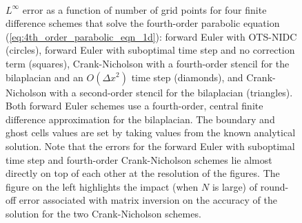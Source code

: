 \documentclass[fleqn,12pt,twoside]{article}
\def\dx{\Delta x}
\begin{document}
\begin{figure}[tb]
\begin{center}
\ \ 
\caption{$L^\infty$ error as a function of number of grid points for four
finite difference schemes that solve the fourth-order parabolic equation
(\ref{eq:4th_order_parabolic_eqn_1d}):
forward Euler with OTS-NIDC (circles),
forward Euler with suboptimal time step and no correction term (squares),
Crank-Nicholson with a fourth-order stencil for the bilaplacian and
an $O(\dx^2)$ time step (diamonds), and Crank-Nicholson with a second-order 
stencil for the bilaplacian (triangles).
Both forward Euler schemes use a fourth-order, central finite difference 
approximation for the bilaplacian.  The boundary and ghost cells values
are set by taking values from the known analytical solution.
Note that the errors for the forward Euler with suboptimal time step and 
fourth-order Crank-Nicholson schemes lie almost directly on top of each 
other at the resolution of the figures.  
The figure on the left highlights the impact (when $N$ is large) of round-off 
error associated with matrix inversion on the accuracy of the solution for the 
two Crank-Nicholson schemes.
}
\label{fig:4th_order_parabolic_eqn_1d_error}
\end{center}
\end{figure}
\end{document}
